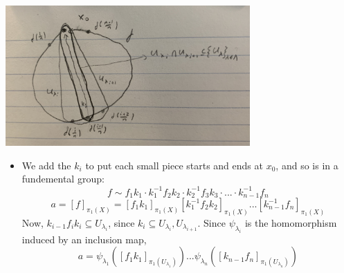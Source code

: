 \documentclass[8pt]{beamer}
\begin{document}
\begin{frame}
\begin{columns}
\begin{column}[T]{0.5\textwidth}
        \begin{center}
          \includegraphics[width=0.7\textwidth]{img/proof-pt1.JPG}
        \end{center}
        \begin{itemize}
          \item We add the $k_i$ to put each small piece starts and ends at $x_0$,
            and so is in a fundemental group:
              \[f \sim f_1k_1\cdot k_1^{-1}f_2k_2 \cdot k_2^{-1}f_3k_3 \cdot ... \cdot k_{n-1}^{-1}f_n\]
              \[a = [f]_{\pi_1(X)} = [f_1k_1]_{\pi_1(X)} [k_1^{-1}f_2k_2]_{\pi_1(X)}
                 ... [k_{n-1}^{-1}f_n]_{\pi_1(X)}\]
            Now, $k_{i-1}f_ik_i \subseteq U_{\lambda_i}$, since $k_i \subseteq
            U_{\lambda_i}, U_{\lambda_{i+1}}$. Since $\psi_{\lambda_i}$ is the
            homomorphism induced by an inclusion map,
              \[ a = \psi_{\lambda_1}([f_1k_1]_{\pi_1(U_{\lambda_1})}) ...
                \psi_{\lambda_n}( [k_{n-1}f_n]_{\pi_1(U_{\lambda_n})})\]

        \end{itemize}
      \end{column}
    \end{columns}
  \end{frame}
\end{document}

